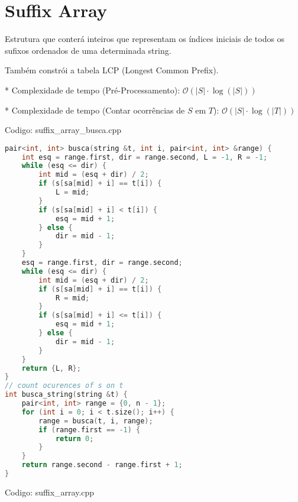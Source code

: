 \documentclass[10pt, a4paper, oneside]{book}
\begin{document}
\section{Suffix Array}


Estrutura que conterá inteiros que representam os índices iniciais de todos os sufixos ordenados de uma determinada string.



Também constrói a tabela LCP (Longest Common Prefix).



* Complexidade de tempo (Pré-Processamento): $\mathcal{O}(|S| \cdot \log(|S|))$

* Complexidade de tempo (Contar ocorrências de \(S\) em \(T\)): $\mathcal{O}(|S| \cdot \log(|T|))$

\hfill

Codigo: suffix\_array\_busca.cpp

\begin{lstlisting}[language=C++]
pair<int, int> busca(string &t, int i, pair<int, int> &range) {
    int esq = range.first, dir = range.second, L = -1, R = -1;
    while (esq <= dir) {
        int mid = (esq + dir) / 2;
        if (s[sa[mid] + i] == t[i]) {
            L = mid;
        }
        if (s[sa[mid] + i] < t[i]) {
            esq = mid + 1;
        } else {
            dir = mid - 1;
        }
    }
    esq = range.first, dir = range.second;
    while (esq <= dir) {
        int mid = (esq + dir) / 2;
        if (s[sa[mid] + i] == t[i]) {
            R = mid;
        }
        if (s[sa[mid] + i] <= t[i]) {
            esq = mid + 1;
        } else {
            dir = mid - 1;
        }
    }
    return {L, R};
}
// count ocurences of s on t
int busca_string(string &t) {
    pair<int, int> range = {0, n - 1};
    for (int i = 0; i < t.size(); i++) {
        range = busca(t, i, range);
        if (range.first == -1) {
            return 0;
        }
    }
    return range.second - range.first + 1;
}\end{lstlisting}
\hfill

Codigo: suffix\_array.cpp
\end{document}
